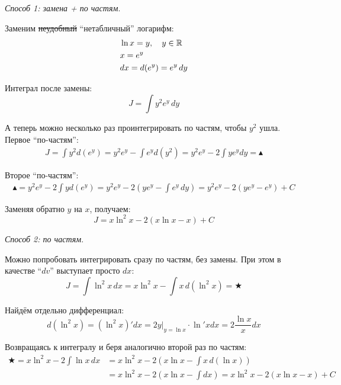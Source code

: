 \documentclass[a4paper,12pt]{article}
\begin{document}
  \begin{solution}
    \mbox{}\par
    \emph{Способ 1: замена + по частям}.
    
    Заменим \sout{неудобный} ``нетабличный'' логарифм:
    \[
      \begin{aligned}
        &\ln x = y,\quad y \in \operatorname{\mathbb R}\\
        &x = e^y\\
        &dx = d(e^y) = e^y\, dy
      \end{aligned}
    \]
    
    Интеграл после замены:
    \[
      J = \int y^2 e^y\, dy
    \]
    
    А теперь можно несколько раз проинтегрировать по частям, чтобы $y^2$ ушла.
    Первое ``по-частям'':
    \begin{equation}
    \begin{split}
      J = \int y^2 d(e^y)
        = y^2 e^y - \int e^y d(y^2)
        = y^2 e^y - 2 \int y e^y dy
        = \blacktriangle
    \end{split}
    \end{equation}
    
    Второе ``по-частям'':
    \begin{equation}
    \begin{split}
      \blacktriangle = y^2 e^y - 2 \int y d(e^y)
        = y^2 e^y - 2 \left(y e^y - \int e^y\, dy\right)
        = y^2 e^y - 2 (y e^y - e^y) + C
    \end{split}
    \end{equation}
    
    Заменяя обратно $y$ на $x$, получаем:
    \[
      J = x \ln^2 x - 2(x \ln x - x) + C
    \]
    
    
    \emph{Способ 2: по частям}.
    
    Можно попробовать интегрировать сразу по частям, без замены.
    При этом в качестве ``$dv$'' выступает просто $dx$:
    \[
      J = \int \ln^2 x\, dx
        = x \ln^2 x - \int x\, d(\ln^2 x)
        = \bigstar 
    \]
    
    Найдём отдельно дифференциал:
    \[
      d(\ln^2 x) = (\ln^2 x)' dx = 2 y|_{y = \ln x} \cdot \ln' x dx = 2 \frac{\ln x}{x} dx
    \]
    
    Возвращаясь к интегралу и беря аналогично второй раз по частям:
    \begin{equation}
    \begin{split}
      \bigstar = x \ln^2 x - 2 \int \ln x\, dx
               &= x \ln^2 x - 2 \left(x \ln x - \int x\, d(\ln x)\right)\\
               &= x \ln^2 x - 2 \left(x \ln x - \int dx\right)
               = x \ln^2 x - 2 (x \ln x - x) + C
    \end{split}
    \end{equation}
    
  \end{solution}
  
\end{document}
